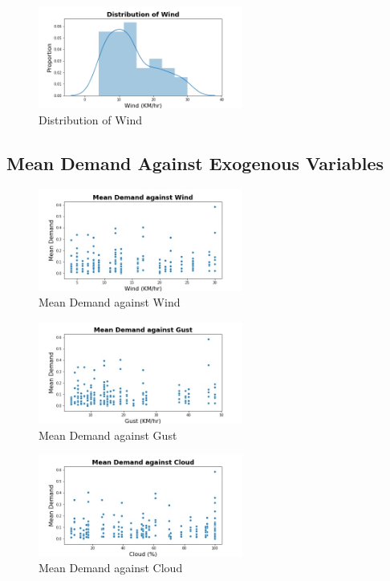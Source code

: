 \documentclass[12pt, letterpaper] {article}
\begin{document}
\begin{figure}[H]
    \centering
    \includegraphics[width=0.6\textwidth, height=0.3\textheight]{Images/distplot_wind.png}
    \caption{Distribution of Wind}
    \label{fig:Distribution of Wind}
\end{figure}

\subsection{Mean Demand Against Exogenous Variables}

\begin{figure}[H]
    \centering
    \includegraphics[width=0.6\textwidth, height=0.3\textheight]{Images/wind_mean_demand.jpg}
    \caption{Mean Demand against Wind}
    \label{fig:Mean Demand against Wind}
\end{figure}

\begin{figure}[H]
    \centering
    \includegraphics[width=0.6\textwidth, height=0.3\textheight]{Images/gust_mean_demand.jpg}
    \caption{Mean Demand against Gust}
    \label{fig:Mean Demand against Gust}
\end{figure}

\begin{figure}[H]
    \centering
    \includegraphics[width=0.6\textwidth, height=0.3\textheight]{Images/cloud_mean_demand.jpg}
    \caption{Mean Demand against Cloud}
    \label{fig:Mean Demand against Cloud}
\end{figure}
\end{document}
